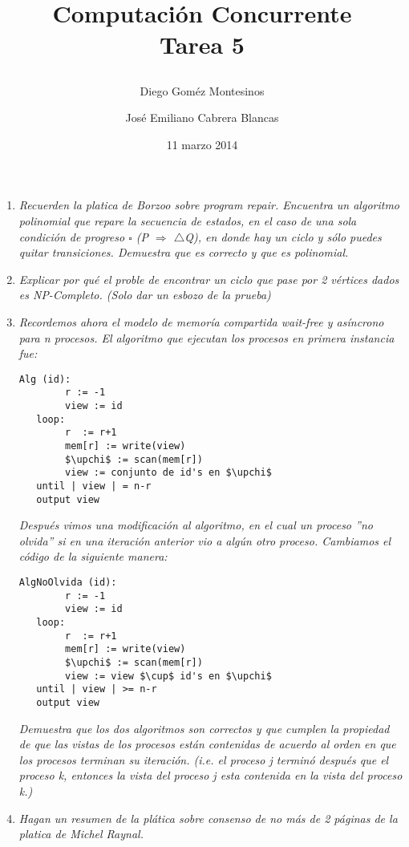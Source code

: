 \documentclass{article}
\title{ Computación Concurrente \\ \Large{Tarea 5}
\author{
  Diego Goméz Montesinos
  \and
  José Emiliano Cabrera Blancas
  }
\date{11 marzo 2014}
}
\begin{document}
\maketitle
\begin{enumerate}
  
\item{
    \textsl{
      Recuerden la platica de Borzoo sobre \textit{program
        repair}. Encuentra un algoritmo polinomial que repare la
      secuencia de estados, en el caso de una sola condición de
      progreso $\square$ (P $\Rightarrow$ $\triangle$Q), en donde hay
      un ciclo y sólo puedes quitar transiciones. Demuestra que es
      correcto y que es polinomial.
    }
  }

  \item{
      \textsl{
        Explicar por qué el proble de encontrar un ciclo que pase por
        2 vértices dados es NP-Completo. (Solo dar un esbozo de la
        prueba)
      }
    }

  \item{
      \textsl{
        Recordemos ahora el modelo de memoría compartida wait-free y
        asíncrono para n procesos. El algoritmo que ejecutan los
        procesos en primera instancia fue:
      }
      \begin{lstlisting}[frame=single,mathescape]
Alg (id):
        r := -1
        view := id
   loop:
        r  := r+1
        mem[r] := write(view)
        $\upchi$ := scan(mem[r])
        view := conjunto de id's en $\upchi$
   until | view | = n-r
   output view
      \end{lstlisting}
      \textsl{
        Después vimos una modificación al algoritmo, en el cual un
        proceso ''no olvida'' si en una iteración anterior vio a algún
        otro proceso. Cambiamos el código de la siguiente manera:
      }
\begin{lstlisting}[frame=single,mathescape]
AlgNoOlvida (id):
        r := -1
        view := id
   loop:
        r  := r+1
        mem[r] := write(view)
        $\upchi$ := scan(mem[r])
        view := view $\cup$ id's en $\upchi$
   until | view | >= n-r
   output view
      \end{lstlisting}
      \textsl{
        Demuestra que los dos algoritmos son correctos y que cumplen
        la propiedad de que las vistas de los procesos están
        contenidas de acuerdo al orden en que los procesos terminan su
        iteración. (i.e. el proceso j terminó después que el proceso
        k, entonces la vista del proceso j esta contenida en la vista
        del proceso k.)
      }
    }

  \item{
      \textsl{
        Hagan un resumen de la plática sobre consenso de no más de 2
        páginas de la platica de Michel Raynal.
      }
    }
    
\end{enumerate}
\end{document}

